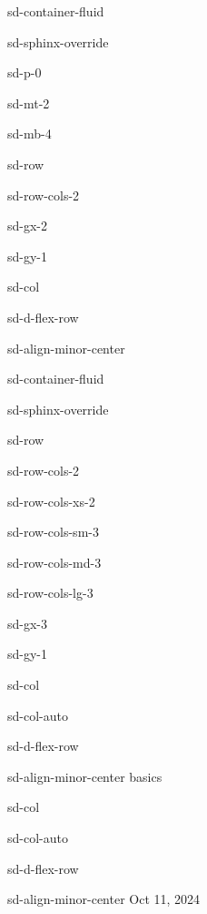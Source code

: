 \documentclass[letterpaper,10pt,english]{jupyterBook}
\begin{document}
\sphinxstepscope

\begin{sphinxuseclass}{sd-container-fluid}
\begin{sphinxuseclass}{sd-sphinx-override}
\begin{sphinxuseclass}{sd-p-0}
\begin{sphinxuseclass}{sd-mt-2}
\begin{sphinxuseclass}{sd-mb-4}
\begin{sphinxuseclass}{sd-row}
\begin{sphinxuseclass}{sd-row-cols-2}
\begin{sphinxuseclass}{sd-gx-2}
\begin{sphinxuseclass}{sd-gy-1}
\begin{sphinxuseclass}{sd-col}
\begin{sphinxuseclass}{sd-d-flex-row}
\begin{sphinxuseclass}{sd-align-minor-center}
\begin{sphinxuseclass}{sd-container-fluid}
\begin{sphinxuseclass}{sd-sphinx-override}
\begin{sphinxuseclass}{sd-row}
\begin{sphinxuseclass}{sd-row-cols-2}
\begin{sphinxuseclass}{sd-row-cols-xs-2}
\begin{sphinxuseclass}{sd-row-cols-sm-3}
\begin{sphinxuseclass}{sd-row-cols-md-3}
\begin{sphinxuseclass}{sd-row-cols-lg-3}
\begin{sphinxuseclass}{sd-gx-3}
\begin{sphinxuseclass}{sd-gy-1}
\begin{sphinxuseclass}{sd-col}
\begin{sphinxuseclass}{sd-col-auto}
\begin{sphinxuseclass}{sd-d-flex-row}
\begin{sphinxuseclass}{sd-align-minor-center}
\sphinxAtStartPar
basics

\end{sphinxuseclass}
\end{sphinxuseclass}
\end{sphinxuseclass}
\end{sphinxuseclass}
\begin{sphinxuseclass}{sd-col}
\begin{sphinxuseclass}{sd-col-auto}
\begin{sphinxuseclass}{sd-d-flex-row}
\begin{sphinxuseclass}{sd-align-minor-center}
\sphinxAtStartPar
Oct 11, 2024


\end{sphinxuseclass}
\end{sphinxuseclass}
\end{sphinxuseclass}
\end{sphinxuseclass}
\end{sphinxuseclass}
\end{sphinxuseclass}
\end{sphinxuseclass}
\end{sphinxuseclass}
\end{sphinxuseclass}
\end{sphinxuseclass}
\end{sphinxuseclass}
\end{sphinxuseclass}
\end{sphinxuseclass}
\end{sphinxuseclass}
\end{sphinxuseclass}
\end{sphinxuseclass}
\end{sphinxuseclass}
\end{sphinxuseclass}
\end{sphinxuseclass}
\end{sphinxuseclass}
\end{sphinxuseclass}
\end{sphinxuseclass}
\end{sphinxuseclass}
\end{sphinxuseclass}
\end{sphinxuseclass}
\end{sphinxuseclass}
\end{document}
